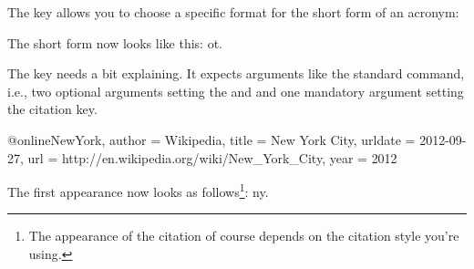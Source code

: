 \documentclass[DIV10,toc=index,toc=bib,hyperfootnotes=false]{cnpkgdoc}
\begin{document}
The  key allows you to choose a specific format for the short form of
an acronym:
\begin{beispiel}
\end{beispiel}
The short form now looks like this: \acs{ot}.

The  key needs a bit explaining. It expects arguments like the standard
 command, i.e., two optional arguments setting the 
and  and one mandatory argument setting the citation key.
\begin{beispiel}
 @online{NewYork,
   author  = {Wikipedia},
   title   = {New York City},
   urldate = {2012-09-27},
   url     = {http://en.wikipedia.org/wiki/New_York_City},
   year    = {2012}
 }
\end{beispiel}
The first appearance now looks as follows\footnote{The appearance of the citation
of course depends on the citation style you're using.}: \acf{ny}.
\end{document}
